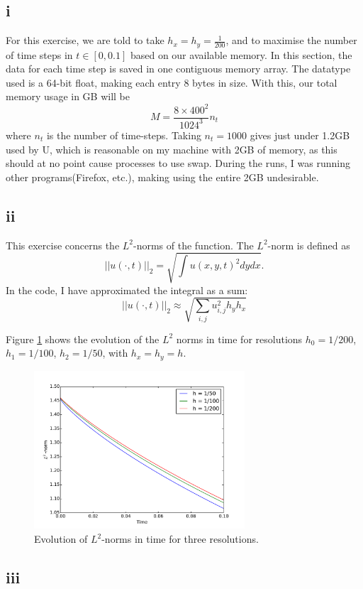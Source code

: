 \documentclass{article}
\begin{document}
\subsection*{i}
For this exercise, we are told to take $h_x = h_y = \frac{1}{200}$, and to maximise the number of
time steps in $t \in [0,0.1]$ based on our available memory. In this section, the data for each
time step is saved in one contiguous memory array. The datatype used is a 64-bit float, making
each entry 8 bytes in size. With this, our total memory usage in GB will be 
$$
  M = \frac{8 \times 400^2}{1024^3}n_t
$$
where $n_t$ is the number of time-steps.
Taking $n_t = 1000$ gives just under 1.2GB used by U, which is reasonable on my machine with 2GB
of memory, as this should at no point cause processes to use swap. During the runs, I was
running other programs(Firefox, etc.), making using the entire 2GB undesirable.

\subsection*{ii}
This exercise concerns the $L^2$-norms of the function. The $L^2$-norm is defined as
$$
  | |u(\cdot,t) | |_2 = \sqrt{\int u(x,y,t)^2 dy dx}.
$$
In the code, I have approximated the integral as a sum:
$$
 | | u(\cdot,t) | |_2 \approx \sqrt{ \sum_{i,j} u_{i,j}^2 h_y h_x }
$$

Figure \ref{f:2} shows the evolution of the $L^2$ norms in time for resolutions
$h_0 = 1/200$, $h_1 = 1/100$, $h_2 = 1/50$, with $h_x = h_y = h$.
\begin{figure}
  \centering
  \includegraphics[width=0.7\textwidth]{2/2/plot.pdf}
  \caption{Evolution of $L^2$-norms in time for three resolutions.}
  \label{f:2}
\end{figure}




\subsection*{iii}
\end{document}
